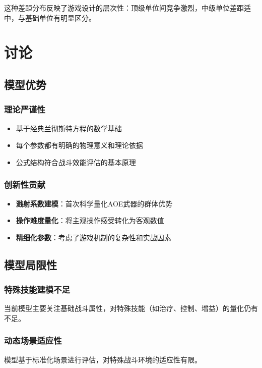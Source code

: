 \documentclass[a4paper,12pt]{article}
\begin{document}
这种差距分布反映了游戏设计的层次性：顶级单位间竞争激烈，中级单位差距适中，与基础单位有明显区分。

\section{讨论}

\subsection{模型优势}

\subsubsection{理论严谨性}
\begin{itemize}
    \item 基于经典兰彻斯特方程的数学基础
    \item 每个参数都有明确的物理意义和理论依据
    \item 公式结构符合战斗效能评估的基本原理
\end{itemize}

\subsubsection{创新性贡献}
\begin{itemize}
    \item \textbf{溅射系数建模}：首次科学量化AOE武器的群体优势
    \item \textbf{操作难度量化}：将主观操作感受转化为客观数值
    \item \textbf{精细化参数}：考虑了游戏机制的复杂性和实战因素
\end{itemize}

\subsection{模型局限性}

\subsubsection{特殊技能建模不足}
当前模型主要关注基础战斗属性，对特殊技能（如治疗、控制、增益）的量化仍有不足。

\subsubsection{动态场景适应性}
模型基于标准化场景进行评估，对特殊战斗环境的适应性有限。
\end{document}
